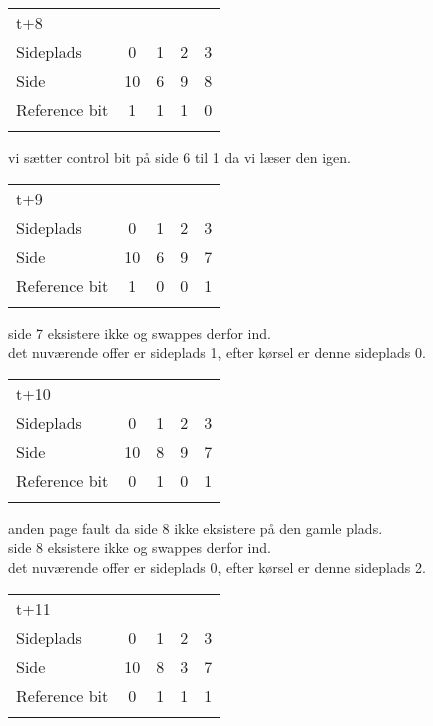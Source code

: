 \documentclass[titlepage]{article}
\begin{document}
\begin{tabular}{l | c | c | c | c}
t+8\\
Sideplads    & 0 & 1 & 2 & 3\\
Side         & 10 & 6 & 9 & 8\\
Reference bit & 1 & 1 & 1 & 0\\\\
\end{tabular}

vi sætter control bit på side 6 til 1 da vi læser den igen.\\


\begin{tabular}{l | c | c | c | c}
t+9\\
Sideplads    & 0 & 1 & 2 & 3\\
Side         & 10 & 6 & 9 & 7\\
Reference bit & 1 & 0 & 0 & 1\\\\
\end{tabular}

side 7 eksistere ikke og swappes derfor ind.\\
det nuværende offer er sideplads 1, efter kørsel er denne sideplads 0.\\

\begin{tabular}{l | c | c | c | c}
t+10\\
Sideplads    & 0 & 1 & 2 & 3\\
Side         & 10 & 8 & 9 & 7\\
Reference bit & 0 & 1 & 0 & 1\\\\
\end{tabular}

anden page fault da side 8 ikke eksistere på den gamle plads.\\
side 8 eksistere ikke og swappes derfor ind.\\
det nuværende offer er sideplads 0, efter kørsel er denne sideplads 2.\\

\begin{tabular}{l | c | c | c | c}
t+11\\
Sideplads    & 0 & 1 & 2 & 3\\
Side         & 10 & 8 & 3 & 7\\
Reference bit & 0 & 1 & 1 & 1\\\\
\end{tabular}
\end{document}
